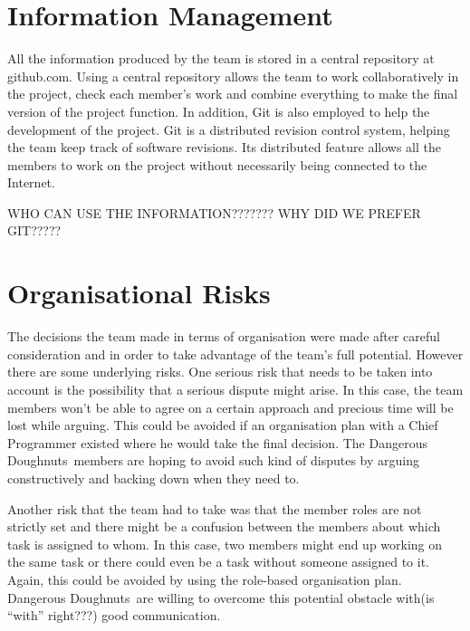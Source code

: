 \documentclass{article}
\newcommand{\dnd}{Dangerous Doughnuts}
\begin{document}

\section{Information Management}
\label{info}

All the information produced by the team is stored in a central repository at github.com. Using a central repository allows the team to work collaboratively in the project, check each member's work and combine everything to make the final version of the project function. In addition, Git is also employed to help the development of the project. Git is a distributed revision control system, helping the team keep track of software revisions. Its distributed feature allows all the members to work on the project without necessarily being connected to the Internet.

WHO CAN USE THE INFORMATION??????? WHY DID WE PREFER GIT?????



\section{Organisational Risks}
\label{lastSection}

The decisions the team made in terms of organisation were made after careful consideration and in order to take advantage of the team's full potential. However there are some underlying risks. One serious risk that needs to be taken into account is the possibility that a serious dispute might arise. In this case, the team members won't be able to agree on a certain approach and precious time will be lost while arguing. This could be avoided if an organisation plan with a Chief Programmer existed where he would take the final decision. The \dnd\ members are hoping to avoid such kind of disputes by arguing constructively and backing down when they need to.

Another risk that the team had to take was that the member roles are not strictly set and there might be a confusion between the members about which task is assigned to whom. In this case, two members might end up working on the same task or there could even be a task without someone assigned to it. Again, this could be avoided by using the role-based organisation plan. \dnd\ are willing to overcome this potential obstacle with(is ``with'' right???) good communication.




\end{document}
